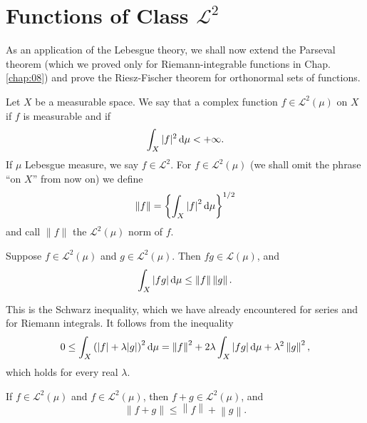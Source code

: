 
\section{Functions of Class $\mathscr{L}^2$}

As an application of the Lebesgue theory,
we shall now extend the Parseval theorem
(which we proved only for Riemann-integrable functions in Chap. \ref{chap:08})
and prove the Riesz-Fischer theorem for orthonormal sets of functions.

\begin{mydef}
    \label{mydef:11.34}
    Let $X$ be a measurable space.
    We say that a complex
    function $f \in \mathscr{L}^2(\mu)$ on $X$ if $f$ is measurable and if
    \begin{equation*}
        \int_X |f|^2 \d \mu < +\infty .
    \end{equation*}
    If $\mu$ Lebesgue measure,
    we say $f \in \mathscr{L}^2$.
    For $f \in \mathscr{L}^2(\mu)$
    (we shall omit the phrase ``on $X$'' from now on) we define
    \begin{equation*}
        \left\| f \right\| =
        \left\{ \int_X \left| f \right|^2 \d \mu \right\}^{1/2}
    \end{equation*}
    and call $\|f\|$ the $\mathscr{L}^2(\mu)$ norm of $f$.
\end{mydef}

\begin{thm}
    \label{thm:11.35}
    Suppose $ f \in \mathscr{L}^2(\mu)$
    and     $ g \in \mathscr{L}^2(\mu)$.
    Then    $fg \in \mathscr{L}  (\mu)$,
    and
    \begin{equation}
        \label{eq:11.98}
        \int_X \left| fg \right| \d \mu \leq
        \left\| f \right\| \left\| g \right\| .
    \end{equation}
\end{thm}

This is the Schwarz inequality,
which we have already encountered for series and for Riemann integrals.
It follows from the inequality
\begin{equation*}
    0 \leq
    \int_X \left( | f | + \lambda | g |  \right)^2 \d \mu =
    \left\| f \right\|^2 +
    2 \lambda \int_X | fg | \d \mu + \lambda^2 \left\| g \right\|^2 ,
\end{equation*}
which holds for every real $\lambda$.

\begin{thm}
    \label{thm:11.36}
    If   $f \in \mathscr{L}^2(\mu)$
    and  $f \in \mathscr{L}^2(\mu)$,
    then $f + g \in \mathscr{L}^2(\mu)$,
    and
    \begin{equation*}
        \left\| f + g \right\| \leq
        \left\| f \right\| + \left\| g \right\| .
    \end{equation*}
\end{thm}

